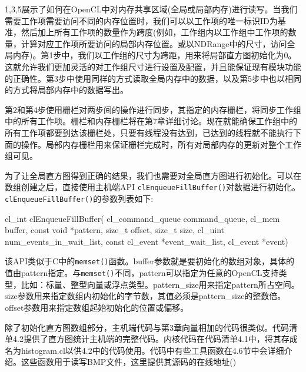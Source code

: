 1,3,5展示了如何在OpenCL中对内存共享区域(全局或局部内存)进行读写。当我们需要工作项需要访问不同的内存位置时，我们可以以工作项的唯一标识ID为基准，然后加上所有工作项的数量作为跨度(例如，工作组内以工作组中工作项的数量，计算对应工作项所要访问的局部内存位置。或以NDRange中的尺寸，访问全局内存)。第1步中，我们以工作组的尺寸为跨距，用来将局部直方图初始化为0。这就允许我们更加灵活的对工作组尺寸进行设置及配置，并且能保证现有模块功能的正确性。第3步中使用同样的方式读取全局内存中的数据，以及第5步中也以相同的方式将局部内存中的数据写出。

第2和第4步使用栅栏对两步间的操作进行同步，其指定的内存栅栏，将同步工作组中的所有工作项。栅栏和内存栅栏将在第7章详细讨论。现在就能确保工作组中的所有工作项都要到达该栅栏处，只要有线程没有达到，已达到的线程就不能执行下面的操作。局部内存栅栏用来保证栅栏完成时，所有对局部内存的更新对整个工作组可见。

为了让全局直方图得到正确的结果，我们也需要对全局直方图进行初始化。可以在数组创建之后，直接使用主机端API \texttt{clEnqueueFillBuffer()}对数据进行初始化。\texttt{clEnqueueFillBuffer()}的参数列表如下:

\begin{codebox}[cpp]
cl_int
clEnqueueFillBuffer(
  cl_command_queue command_queue,
  cl_mem buffer,
  const void *pattern,
  size_t offset,
  size_t size,
  cl_uint num_events_in_wait_list,
  const cl_event *event_wait_list,
  cl_event *event)
\end{codebox}

该API类似于C中的\texttt{memset()}函数。buffer参数就是要初始化的数组对象，具体的值由pattern指定。与\texttt{memset()}不同，pattern可以指定为任意的OpenCL支持类型，比如：标量、整型向量或浮点类型。pattern\_\allowbreak{}size用来指定pattern所占空间。size参数用来指定数组内初始化的字节数，其值必须是pattern\_\allowbreak{}size的整数倍。offset参数用来指定数组起始初始化的位置或偏移。

除了初始化直方图数组部分，主机端代码与第3章向量相加的代码很类似。代码清单4.2提供了直方图统计主机端的完整代码。内核代码在代码清单4.1中，将其存成名为histogram.cl以供4.2中的代码使用。代码中有些工具函数在4.6节中会详细介绍。这些函数用于读写BMP文件，这里提供其源码的在线地址()


